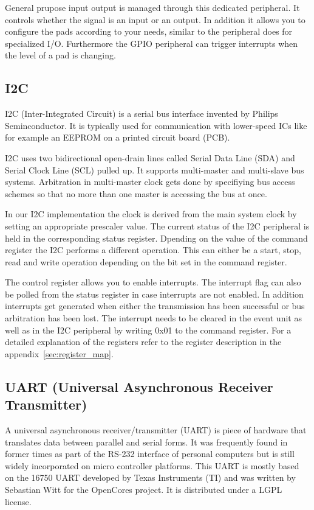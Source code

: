 General prupose input output is managed through this dedicated peripheral. It controls whether the signal is an input or an output. In addition it allows you to configure the pads according to your needs, similar to the \pulpino peripheral does for specialized I/O. Furthermore the GPIO peripheral can trigger interrupts when the level of a pad is changing.

\subsection{I2C}

I2C (Inter-Integrated Circuit) is a serial bus interface invented by Philips Seminconductor. It is typically used for communication with lower-speed ICs like for example an EEPROM on a printed circuit board (PCB).

I2C uses two bidirectional open-drain lines called Serial Data Line (SDA) and Serial Clock Line (SCL) pulled up. It supports multi-master and multi-slave bus systems. Arbitration in multi-master clock gets done by specifiying bus access schemes so that no more than one master is accessing the bus at once.

In our I2C implementation the clock is derived from the main system clock by setting an appropriate prescaler value. The current status of the I2C peripheral is held in the corresponding status register. Dpending on the value of the command register the I2C performs a different operation. This can either be a start, stop, read and write operation depending on the bit set in the command register. 

The control register allows you to enable interrupts. The interrupt flag can also be polled from the status register in case interrupts are not enabled. In addition interrupts get generated when either the transmission has been successful or bus arbitration has been lost. The interrupt needs to be cleared in the event unit as well as in the I2C peripheral by writing 0x01 to the command register. For a detailed explanation of the registers refer to the register description in the appendix~\ref{sec:register_map}. 

\subsection{UART (Universal Asynchronous Receiver Transmitter)}

A universal asynchronous receiver/transmitter (UART) is piece of hardware that translates data between parallel and serial forms. It was frequently found in former times as part of the RS-232 interface of personal computers but is still widely incorporated on micro controller platforms. This UART is mostly based on the 16750 UART developed by Texas Instruments (TI) and was written by Sebastian Witt for the OpenCores project. It is distributed under a LGPL license. 

